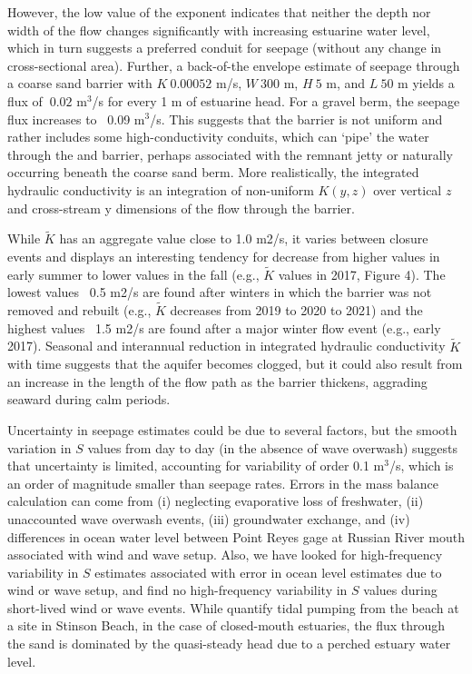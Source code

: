 \documentclass[preprint,12pt,authoryear]{elsarticle}
\begin{document}
However, the low value of the exponent indicates that neither the depth nor width of the flow changes significantly with increasing estuarine water level, which in turn suggests a preferred conduit for seepage (without any change in cross-sectional area). Further, a back-of-the envelope estimate of seepage through a coarse sand barrier with $K ~ 0.00052$ m/s, $W ~ 300$ m, $H ~ 5$ m, and $L ~ 50$ m yields a flux of $~0.02$ m$^3$/s for every 1 m of estuarine head. For a gravel berm, the seepage flux increases to ~0.09 m$^3$/s. This suggests that the barrier is not uniform and rather includes some high-conductivity conduits, which can `pipe' the water through the and barrier, perhaps associated with the remnant jetty or naturally occurring beneath the coarse sand berm. More realistically, the integrated hydraulic conductivity is an integration of non-uniform $K(y,z)$ over vertical $z$ and cross-stream y dimensions of the flow through the barrier. 

While $\tilde K$ has an aggregate value close to 1.0 m2/s, it varies between closure events and displays an interesting tendency for decrease from higher values in early summer to lower values in the fall (e.g., $\tilde K$ values in 2017, Figure 4). The lowest values ~0.5 m2/s are found after winters in which the barrier was not removed and rebuilt (e.g., $\tilde K$ decreases from 2019 to 2020 to 2021) and the highest values ~1.5 m2/s are found after a major winter flow event (e.g., early 2017). Seasonal and interannual reduction in integrated hydraulic conductivity $\tilde K$ with time suggests that the aquifer becomes clogged, but it could also result from an increase in the length of the flow path as the barrier thickens, aggrading seaward during calm periods.

Uncertainty in seepage estimates could be due to several factors, but the smooth variation in $S$ values from day to day (in the absence of wave overwash) suggests that uncertainty is limited, accounting for variability of order 0.1 m$^3$/s, which is an order of magnitude smaller than seepage rates. Errors in the mass balance calculation can come from (i) neglecting evaporative loss of freshwater, (ii) unaccounted wave overwash events, (iii) groundwater exchange, and (iv) differences in ocean water level between Point Reyes gage at Russian River mouth associated with wind and wave setup.
Also, we have looked for high-frequency variability in $S$ estimates associated with error in ocean level estimates due to wind or wave setup, and find no high-frequency variability in $S$ values during short-lived wind or wave events. While \citet{de2011submarine}  quantify tidal pumping from the beach at a site in Stinson Beach, in the case of closed-mouth estuaries, the flux through the sand is dominated by the quasi-steady head due to a perched estuary water level.
\end{document}
